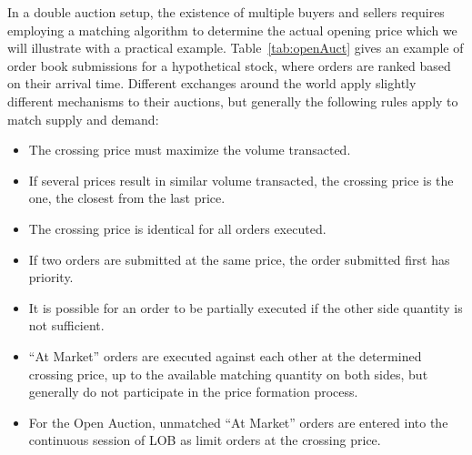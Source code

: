 In a double auction setup, the existence of multiple buyers and sellers requires employing a matching algorithm to determine the actual opening price which we will illustrate with a practical example. Table~\ref{tab:openAuct} gives an example of order book submissions for a hypothetical stock, where orders are ranked based on their arrival time. Different exchanges around the world apply slightly different mechanisms to their auctions, but generally the following rules apply to match supply and demand:
        \begin{itemize}
        \item The crossing price must maximize the volume transacted.
        \item If several prices result in similar volume transacted, the crossing price is the one, the closest from the last price. 
        \item The crossing price is identical for all orders executed.
        \item If two orders are submitted at the same price, the order submitted first has priority.
        \item It is possible for an order to be partially executed if the other side quantity is not sufficient.
        \item ``At Market'' orders are executed against each other at the determined crossing price, up to the available matching quantity on both sides, but generally do not participate in the price formation process.
        \item For the Open Auction, unmatched ``At Market'' orders are entered into the continuous session of LOB as limit orders at the crossing price.
        \end{itemize} 


